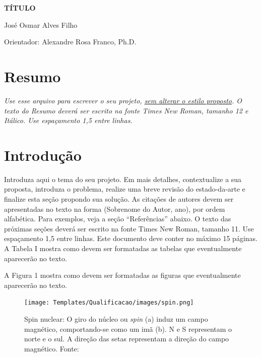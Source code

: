 \documentclass[11pt]{article}
\begin{document}
\pagestyle{fancy}

\begin{center}
  {\fontsize{14pt}{\baselineskip}\selectfont
  \textsf{\textbf{\newline TÍTULO}}}

  {\fontsize{12pt}{\baselineskip}\selectfont
  \textsf{José Osmar Alves Filho}}

  {\fontsize{10pt}{\baselineskip}\selectfont
  \textsf{Orientador: Alexandre Rosa Franco, Ph.D.}}

\end{center}

\section*{Resumo}
{
 \fontsize{12pt}{\baselineskip}\selectfont
  \textit{
	Use esse arquivo para escrever o seu projeto, \underline{sem alterar o estilo proposto}. O texto do Resumo deverá ser escrito na fonte Times New Roman, tamanho 12 e Itálico. Use espaçamento 1,5 entre linhas.
  }
 }
 

\section{Introdução} \label{ch:introducao}

Introduza aqui o tema do seu projeto. Em mais detalhes, contextualize a sua proposta, introduza o problema, realize uma breve revisão do estado-da-arte e finalize esta seção propondo sua solução. 
As citações de autores devem ser apresentadas no texto na forma (Sobrenome do Autor, ano), por ordem alfabética. Para exemplos, veja a seção “Referências” abaixo. O texto das próximas seções deverá ser escrito na fonte Times New Roman, tamanho 11. Use espaçamento 1,5 entre linhas. Este documento deve conter no máximo 15 páginas. 
A Tabela I mostra como devem ser formatadas as tabelas que eventualmente aparecerão no texto. 

A Figura 1 mostra como devem ser formatadas as figuras que eventualmente aparecerão no texto.

\begin{figure}[!htb]
 \centering
 \texttt{[image: Templates/Qualificacao/images/spin.png]}
 \caption{\label{fig:spin_nuclei}Spin nuclear: O giro do núcleo ou \textit{spin} (a) induz um campo magnético, comportando-se como um imã (b). N e S representam o norte e o sul. A direção das setas representam a direção do campo magnético. Fonte: \citep{Grover2015}}
\end{figure}
\end{document}
